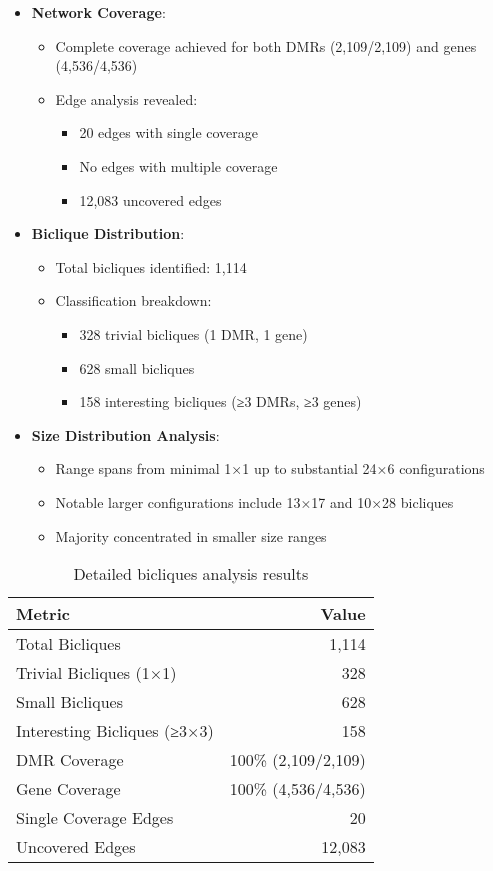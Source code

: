 \documentclass{article}
\begin{document}
\begin{itemize}
    \item \textbf{Network Coverage}:
    \begin{itemize}
        \item Complete coverage achieved for both DMRs (2,109/2,109) and genes (4,536/4,536)
        \item Edge analysis revealed:
        \begin{itemize}
            \item 20 edges with single coverage
            \item No edges with multiple coverage
            \item 12,083 uncovered edges
        \end{itemize}
    \end{itemize}
    
    \item \textbf{Biclique Distribution}:
    \begin{itemize}
        \item Total bicliques identified: 1,114
        \item Classification breakdown:
        \begin{itemize}
            \item 328 trivial bicliques (1 DMR, 1 gene)
            \item 628 small bicliques
            \item 158 interesting bicliques (≥3 DMRs, ≥3 genes)
        \end{itemize}
    \end{itemize}
    
    \item \textbf{Size Distribution Analysis}:
    \begin{itemize}
        \item Range spans from minimal 1×1 up to substantial 24×6 configurations
        \item Notable larger configurations include 13×17 and 10×28 bicliques
        \item Majority concentrated in smaller size ranges
    \end{itemize}
\end{itemize}

\begin{table}[h]
\centering
\begin{tabular}{lr}
\toprule
\textbf{Metric} & \textbf{Value} \\
\midrule
Total Bicliques & 1,114 \\
Trivial Bicliques (1×1) & 328 \\
Small Bicliques & 628 \\
Interesting Bicliques (≥3×3) & 158 \\
DMR Coverage & 100\% (2,109/2,109) \\
Gene Coverage & 100\% (4,536/4,536) \\
Single Coverage Edges & 20 \\
Uncovered Edges & 12,083 \\
\bottomrule
\end{tabular}
\caption{Detailed bicliques analysis results}
\label{table:biclique_results}
\end{table}
\end{document}
